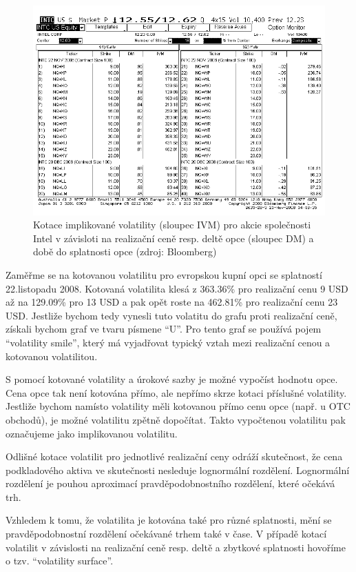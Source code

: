 \documentclass[a4paper]{book}
\begin{document}
\begin{figure}
  \includegraphics[bb=0 0 350 250]{intel.bmp}
  \caption{Kotace implikované volatility (sloupec IVM) pro akcie společnosti Intel v závisloti na realizační ceně resp. deltě opce (sloupec DM) a době do splatnosti opce (zdroj: Bloomberg)}
  \label{intel_volatility}
\end{figure}

Zaměřme se na kotovanou volatilitu pro evropskou kupní opci se splatností 22.listopadu 2008. Kotovaná volatilita klesá z 363.36\% pro realizační cenu 9 USD až na 129.09\% pro 13 USD a pak opět roste na 462.81\% pro realizační cenu 23 USD. Jestliže bychom tedy vynesli tuto volatitu do grafu proti realizační ceně, získali bychom graf ve tvaru písmene ``U''. Pro tento graf se používá pojem ``volatility smile'', který má vyjadřovat typický vztah mezi realizační cenou a kotovanou volatilitou.

S pomocí kotované volatility a úrokové sazby je možné vypočíst hodnotu opce. Cena opce tak není kotována přímo, ale nepřímo skrze kotaci příslušné volatility. Jestliže bychom namísto volatility měli kotovanou přímo cenu opce (např. u OTC obchodů), je možné volatilitu zpětně dopočítat. Takto vypočtenou volatilitu pak označujeme jako implikovanou volatilitu.

Odlišné kotace volatilit pro jednotlivé realizační ceny odráží skutečnost, že cena podkladového aktiva ve skutečnosti nesleduje lognormální rozdělení. Lognormální rozdělení je pouhou aproximací pravděpodobnostního rozdělení, které očekává trh.

Vzhledem k tomu, že volatilita je kotována také pro různé splatnosti, mění se pravděpodobnostní rozdělení očekávané trhem také v čase. V případě kotací volatilit v závislosti na realizační ceně resp. deltě a zbytkové splatnosti hovoříme o tzv. ``volatility surface''.
\end{document}
